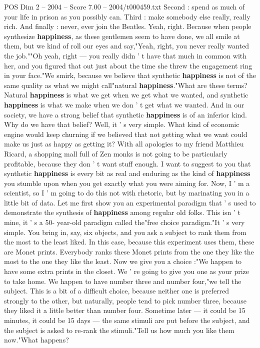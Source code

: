 \begin{textsample}{POS Dim 2 – 2004 – Score 7.00 – 2004/t000459.txt}
Second : spend as much of your life in prison as you possibly can.
Third : make somebody else really, really rich.
And finally : never, ever join the Beatles.
Yeah, right.
Because when people synthesize \textbf{happiness}, as these gentlemen seem to have done, we all smile at them, but we kind of roll our eyes and say,"Yeah, right, you never really wanted the job.""Oh yeah, right — you really didn ' t have that much in common with her, and you figured that out just about the time she threw the engagement ring in your face."We smirk, because we believe that synthetic \textbf{happiness} is not of the same quality as what we might call"natural \textbf{happiness}."What are these terms?
Natural \textbf{happiness} is what we get when we get what we wanted, and synthetic \textbf{happiness} is what we make when we don ' t get what we wanted.
And in our society, we have a strong belief that synthetic \textbf{happiness} is of an inferior kind.
Why do we have that belief?
Well, it ' s very simple.
What kind of economic engine would keep churning if we believed that not getting what we want could make us just as happy as getting it?
With all apologies to my friend Matthieu Ricard, a shopping mall full of Zen monks is not going to be particularly profitable, because they don ' t want stuff enough.
I want to suggest to you that synthetic \textbf{happiness} is every bit as real and enduring as the kind of \textbf{happiness} you stumble upon when you get exactly what you were aiming for.
Now, I ' m a scientist, so I ' m going to do this not with rhetoric, but by marinating you in a little bit of data.
Let me first show you an experimental paradigm that ' s used to demonstrate the synthesis of \textbf{happiness} among regular old folks.
This isn ' t mine, it ' s a 50- year-old paradigm called the"free choice paradigm."It ' s very simple.
You bring in, say, six objects, and you ask a subject to rank them from the most to the least liked.
In this case, because this experiment uses them, these are Monet prints.
Everybody ranks these Monet prints from the one they like the most to the one they like the least.
Now we give you a choice :"We happen to have some extra prints in the closet.
We ' re going to give you one as your prize to take home.
We happen to have number three and number four,"we tell the subject.
This is a bit of a difficult choice, because neither one is preferred strongly to the other, but naturally, people tend to pick number three, because they liked it a little better than number four.
Sometime later — it could be 15 minutes, it could be 15 days — the same stimuli are put before the subject, and the subject is asked to re-rank the stimuli."Tell us how much you like them now."What happens?

\end{textsample}
